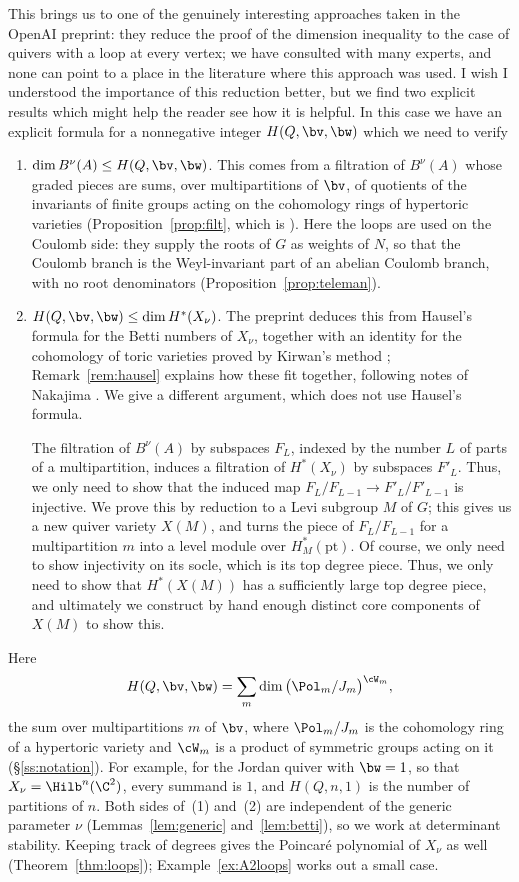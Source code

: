 \documentclass[11pt]{amsart}
\begin{document}
This brings us to one of the genuinely interesting approaches taken in the OpenAI preprint: they reduce the proof of the dimension inequality to the case of quivers with a loop at every vertex; we have consulted with many experts, and none can point to a place in the literature where this approach was used.  I wish I understood the importance of this reduction better, but we find two explicit results which might help the reader see how it is helpful.  In this case we have an explicit formula for a nonnegative integer $H(Q,\bv,\bw)$ which we need to verify
\begin{enumerate}
\item $\dim B^\nu(A)\le H(Q,\bv,\bw)$.  This comes from a filtration of
$B^\nu(A)$ whose graded pieces are sums, over multipartitions of $\bv$, of
quotients of the invariants of finite groups acting on the cohomology rings
of hypertoric varieties (Proposition~\ref{prop:filt}, which is
).  Here the loops are used on the Coulomb side: they supply
the roots of $G$ as weights of $N$, so that the Coulomb branch is the
Weyl-invariant part of an abelian Coulomb branch, with no root denominators
(Proposition~\ref{prop:teleman}).
\item $H(Q,\bv,\bw)\le\dim H^*(X_\nu)$.  The preprint deduces this from
Hausel's formula \cite{hauselBettiNumbers2006} for the Betti numbers of $X_\nu$,
together with an identity for the cohomology of toric varieties proved by
Kirwan's method ; Remark~\ref{rem:hausel} explains how these fit
together, following notes of Nakajima \cite{nakajimaMultipartitionSpaces2026}.  We
give a different argument, which does not use Hausel's formula.  

The filtration of $B^{\nu}(A)$ by subspaces $F_L$, indexed by the number $L$ of parts of a multipartition, induces a filtration of $H^*(X_\nu)$ by subspaces $F'_L$.  Thus, we only need to show that the induced map $F_L/F_{L-1}\to F'_L/F'_{L-1}$ is injective.  We prove this by reduction to a Levi subgroup $M$ of $G$; this gives us a new quiver variety $X(M)$, and turns the piece of $F_L/F_{L-1}$ for a multipartition $m$ into a level module over $H^*_M(\mathrm{pt})$.  Of course, we only need to show injectivity on its socle, which is its top degree piece.  Thus, we only need to show that $H^*(X(M))$ has a sufficiently large top degree piece, and ultimately we construct by hand enough distinct core components of $X(M)$ to show this.
\end{enumerate}
Here
\[
 H(Q,\bv,\bw)=\sum_m\dim\big(\Pol_m/J_m\big)^{\cW_m},
\]
the sum over multipartitions $m$ of $\bv$, where $\Pol_m/J_m$ is the
cohomology ring of a hypertoric variety and $\cW_m$ is a product of symmetric
groups acting on it (\S\ref{ss:notation}).  For example, for the Jordan quiver
with $\bw=1$, so that $X_\nu=\Hilb^n(\C^2)$, every summand is $1$, and
$H(Q,n,1)$ is the number of partitions of $n$.  Both sides of~(1) and~(2) are
independent of the generic parameter $\nu$ (Lemmas~\ref{lem:generic}
and~\ref{lem:betti}), so we work at determinant stability.  Keeping track of
degrees gives the Poincar\'e polynomial of $X_\nu$ as well
(Theorem~\ref{thm:loops}); Example~\ref{ex:A2loops} works out a small case.
\end{document}
